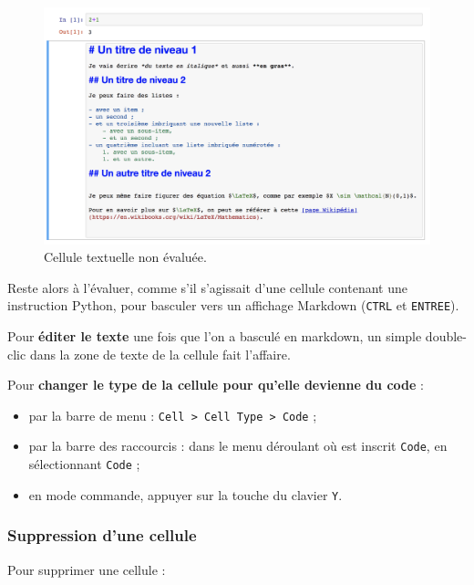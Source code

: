 \documentclass[
  12pt,
]{book}
\providecommand{\tightlist}{%
  \setlength{\itemsep}{0pt}\setlength{\parskip}{0pt}}
\numberwithin{equation}{section}
\numberwithin{countremarque}{section}
\begin{document}
\begin{figure}[h]

{\centering \includegraphics[width=1\linewidth]{figs/jupyter_notebook_3} 

}

\caption{Cellule textuelle non évaluée.}\label{fig:unnamed-chunk-11}
\end{figure}

Reste alors à l'évaluer, comme s'il s'agissait d'une cellule contenant une instruction Python, pour basculer vers un affichage Markdown (\texttt{CTRL} et \texttt{ENTREE}).

Pour \textbf{éditer le texte} une fois que l'on a basculé en markdown, un simple double-clic dans la zone de texte de la cellule fait l'affaire.

Pour \textbf{changer le type de la cellule pour qu'elle devienne du code} :

\begin{itemize}
\tightlist
\item
  par la barre de menu : \texttt{Cell\ \textgreater{}\ Cell\ Type\ \textgreater{}\ Code} ;
\item
  par la barre des raccourcis : dans le menu déroulant où est inscrit \texttt{Code}, en sélectionnant \texttt{Code} ;
\item
  en mode commande, appuyer sur la touche du clavier \texttt{Y}.
\end{itemize}

\subsubsection{Suppression d'une cellule}\label{suppression-dune-cellule}

Pour supprimer une cellule :
\end{document}
